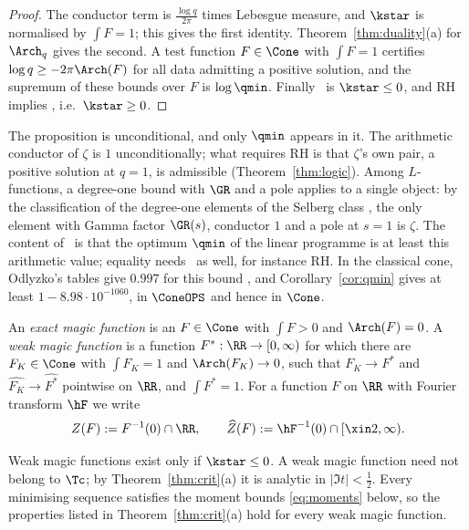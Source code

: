 \begin{proof}
The conductor term is $\frac{\log q}{2\pi}$ times Lebesgue measure, and $\kstar$ is normalised by $\int F=1$; this
gives the first identity. Theorem~\ref{thm:duality}(a) for $\Arch_q$ gives the second. A test function $F\in\Cone$ with
$\int F=1$ certifies $\log q\ge-2\pi\Arch(F)$ for all data admitting a positive solution, and the supremum of these bounds
over $F$ is $\log\qmin$. Finally \condS\ is $\kstar\le0$, and RH implies \condE, i.e.\ $\kstar\ge0$.
\end{proof}

The proposition is unconditional, and only $\qmin$ appears in it. The arithmetic conductor of $\zeta$ is $1$ unconditionally; what
requires RH is that $\zeta$'s own pair, a positive solution at $q=1$, is admissible (Theorem~\ref{thm:logic}). Among $L$-functions, a
degree-one bound with $\GR$ and a pole applies to a single object: by the classification of the degree-one elements of the Selberg class
\cite{CG93,KP99,Sou05}, the only element with Gamma factor $\GR(s)$, conductor $1$ and a pole at $s=1$ is $\zeta$. The content of \condS\
is that the optimum $\qmin$ of the linear programme is at least this arithmetic value; equality needs \condE\ as well, for instance RH.
In the classical cone, Odlyzko's tables give $0.997$ for this bound \cite[Table~4, p.~134]{Odl90}, and Corollary~\ref{cor:qmin} gives
at least $1-8.98\cdot10^{-1060}$, in $\ConeOPS$ and hence in $\Cone$.

\begin{definition}
An \emph{exact magic function} is an $F\in\Cone$ with $\int F>0$ and $\Arch(F)=0$. A \emph{weak magic function} is a
function $F^*:\RR\to[0,\infty)$ for which there are $F_K\in\Cone$ with $\int F_K=1$ and $\Arch(F_K)\to0$, such that
$F_K\to F^*$ and $\widehat{F_K}\to\widehat{F^*}$ pointwise on $\RR$, and $\int F^*=1$. For a function $F$ on $\RR$ with
Fourier transform $\hF$ we write
\[
Z(F):=F^{-1}(0)\cap\RR,\qquad \widehat Z(F):=\hF^{-1}(0)\cap[\xin2,\infty).
\]
\end{definition}

Weak magic functions exist only if $\kstar\le0$. A weak magic function need not belong to $\Tc$; by
Theorem~\ref{thm:crit}(a) it is analytic in $|\Im t|<\frac12$. Every minimising sequence satisfies the moment bounds
\eqref{eq:moments} below, so the properties listed in Theorem~\ref{thm:crit}(a) hold for every weak magic function.

